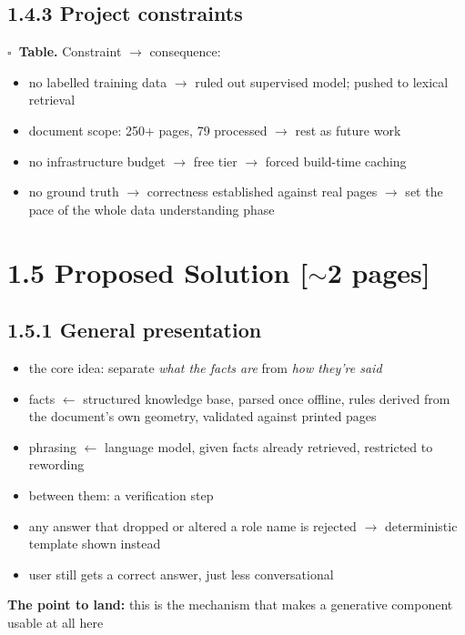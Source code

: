 \documentclass[11pt,a4paper]{article}
\newcommand{\turn}[1]{\par\vspace{3pt}\noindent\textbf{The point to land:} #1\par}
\newcommand{\len}[1]{\hfill\textcolor{gr}{\small[#1]}}
\newcommand{\todo}{$\square$~}
\begin{document}
\subsection*{1.4.3 Project constraints}
\textbf{\todo Table.} Constraint $\rightarrow$ consequence:
\begin{itemize}
\item no labelled training data $\rightarrow$ ruled out supervised model; pushed to lexical retrieval
\item document scope: 250+ pages, 79 processed $\rightarrow$ rest as future work
\item no infrastructure budget $\rightarrow$ free tier $\rightarrow$ forced build-time caching
\item no ground truth $\rightarrow$ correctness established against real pages $\rightarrow$
set the pace of the whole data understanding phase
\end{itemize}

\section*{1.5 Proposed Solution \len{$\sim$2 pages}}

\subsection*{1.5.1 General presentation}
\begin{itemize}
\item the core idea: separate \emph{what the facts are} from \emph{how they're said}
\item facts $\leftarrow$ structured knowledge base, parsed once offline, rules derived
from the document's own geometry, validated against printed pages
\item phrasing $\leftarrow$ language model, given facts already retrieved, restricted to rewording
\item between them: a verification step
\item any answer that dropped or altered a role name is rejected $\rightarrow$
deterministic template shown instead
\item user still gets a correct answer, just less conversational
\end{itemize}
\turn{this is the mechanism that makes a generative component usable at all here}
\end{document}
